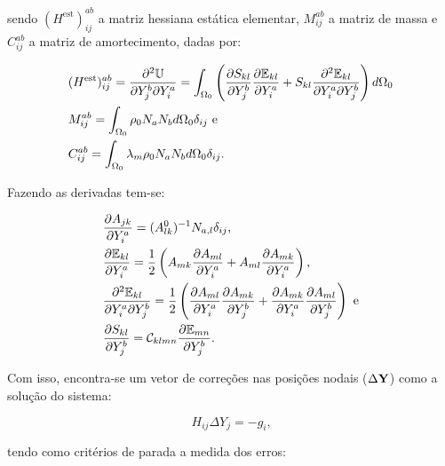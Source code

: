 \documentclass[_ArquivoPrincipal.tex]{subfiles}
\begin{document}
\noindent sendo $(H^\text{est})_{ij}^{ab}$ a matriz hessiana estática elementar, $M_{ij}^{ab}$ a matriz de massa e $C_{ij}^{ab}$ a matriz de amortecimento, dadas por:

\begin{subequations}
    \begin{align}
         & (H^\text{est})_{ij}^{ab}=\frac{\partial^2{\mathbb{U}}}{\partial{Y_j^b}\partial{Y_i^a}}=\int_{\Omega_0}{\left({\frac{\partial{S_{kl}}}{\partial{Y_j^b}}\frac{\partial{\mathbb{E}_{kl}}}{\partial{Y_i^a}}+S_{kl}\frac{\partial^2{\mathbb{E}_{kl}}}{\partial{Y_i^a}\partial{Y_j^b}}}\right) d\Omega_0} \\
         & M_{ij}^{ab}=\int_{\Omega_0}{\rho_0N_aN_b d\Omega_0}\delta_{ij}\text{ e}                                                                                                                        \\
         & C_{ij}^{ab}=\int_{\Omega_0}{\lambda_m\rho_0N_aN_b d\Omega_0}\delta_{ij}\text{.}
    \end{align}
    \label{eq:CSD-HMC}
\end{subequations}

Fazendo as derivadas tem-se:

\begin{subequations}
    \begin{align}
         & \frac{\partial{A_{jk}}}{\partial{Y_i^a}}=(A^0_{lk})^{-1}N_{a,l}\delta_{ij}\text{,}\label{eq:CSD-derA}                                                                                           \\
         & \frac{\partial{\mathbb{E}_{kl}}}{\partial{Y_i^a}}=\frac{1}{2}\left({A_{mk}\frac{\partial{A_{ml}}}{\partial{Y_i^a}}+A_{ml}\frac{\partial{A_{mk}}}{\partial{Y_i^a}}}\right)\text{,}\label{eq:CSD-derE}                                     \\
         & \frac{\partial^2{\mathbb{E}_{kl}}}{\partial{Y_i^a}\partial{Y_j^b}}=\frac{1}{2}\left({\frac{\partial{A_{ml}}}{\partial{Y_i^a}}\frac{\partial{A_{mk}}}{\partial{Y_j^b}}+\frac{\partial{A_{mk}}}{\partial{Y_i^a}}\frac{\partial{A_{ml}}}{\partial{Y_j^b}}}\right)\text{ e}\label{eq:CSD-DderE} \\
         & \frac{\partial{S_{kl}}}{\partial{Y_j^b}}=\mathcal{C}_{klmn}\frac{\partial{\mathbb{E}_{mn}}}{\partial{Y_j^b}}\text{.}\label{eq:CSD-derS}                                                                        \\
    \end{align}
    \label{eq:CSD-derAES}
\end{subequations}

Com isso, encontra-se um vetor de correções nas posições nodais ($\Delta\mathbf{Y}$) como a solução do sistema:

\begin{equation}
    H_{ij}\Delta Y_j=-g_i\text{,}
\end{equation}

\noindent tendo como critérios de parada a medida dos erros:
\end{document}
